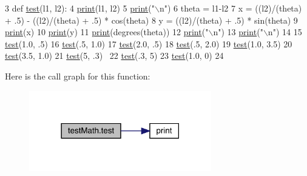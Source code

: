 \begin{DoxyCode}
3 \textcolor{keyword}{def }\hyperlink{namespacetest_math_accae4d78fc0739220d35c06c2c0d5822}{test}(l1, l2):
4     \hyperlink{_a_p_i_8h_ae2dd7886efd463e815dadf10eb54777e}{print}(l1, l2)
5     \hyperlink{_a_p_i_8h_ae2dd7886efd463e815dadf10eb54777e}{print}(\textcolor{stringliteral}{"\(\backslash\)n"})
6     theta = l1-l2
7     x = ((l2)/(theta) + .5) - ((l2)/(theta) + .5) * cos(theta)
8     y = ((l2)/(theta) + .5) * sin(theta)
9     \hyperlink{_a_p_i_8h_ae2dd7886efd463e815dadf10eb54777e}{print}(x)
10     \hyperlink{_a_p_i_8h_ae2dd7886efd463e815dadf10eb54777e}{print}(y)
11     \hyperlink{_a_p_i_8h_ae2dd7886efd463e815dadf10eb54777e}{print}(degrees(theta))
12     \hyperlink{_a_p_i_8h_ae2dd7886efd463e815dadf10eb54777e}{print}(\textcolor{stringliteral}{"\(\backslash\)n"})
13     \hyperlink{_a_p_i_8h_ae2dd7886efd463e815dadf10eb54777e}{print}(\textcolor{stringliteral}{"\(\backslash\)n"})
14 
15 \hyperlink{namespacetest_math_accae4d78fc0739220d35c06c2c0d5822}{test}(1.0, .5)
16 \hyperlink{namespacetest_math_accae4d78fc0739220d35c06c2c0d5822}{test}(.5, 1.0)
17 \hyperlink{namespacetest_math_accae4d78fc0739220d35c06c2c0d5822}{test}(2.0, .5)
18 \hyperlink{namespacetest_math_accae4d78fc0739220d35c06c2c0d5822}{test}(.5, 2.0)
19 \hyperlink{namespacetest_math_accae4d78fc0739220d35c06c2c0d5822}{test}(1.0, 3.5)
20 \hyperlink{namespacetest_math_accae4d78fc0739220d35c06c2c0d5822}{test}(3.5, 1.0)
21 \hyperlink{namespacetest_math_accae4d78fc0739220d35c06c2c0d5822}{test}(5, .3) 
22 \hyperlink{namespacetest_math_accae4d78fc0739220d35c06c2c0d5822}{test}(.3, 5)
23 \hyperlink{namespacetest_math_accae4d78fc0739220d35c06c2c0d5822}{test}(1.0, 0)
24 \end{DoxyCode}
Here is the call graph for this function\+:\nopagebreak
\begin{figure}[H]
\begin{center}
\leavevmode
\includegraphics[width=225pt]{namespacetest_math_accae4d78fc0739220d35c06c2c0d5822_cgraph}
\end{center}
\end{figure}
